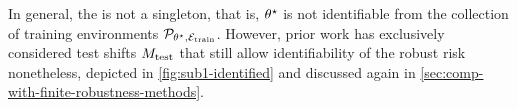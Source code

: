 
In general, the \idset is not a singleton, 
that is, $\theta^{\star}$ is not identifiable from the collection of training environments $\mathcal{P}_{\theta^{\star}, \mathcal{E}_{\mathrm{train}}}$.
However, prior work has exclusively considered test shifts $M_{\mathrm{test}}$ that still allow identifiability of the robust risk nonetheless, depicted in \cref{fig:sub1-identified} and discussed again in \cref{sec:comp-with-finite-robustness-methods}. 
